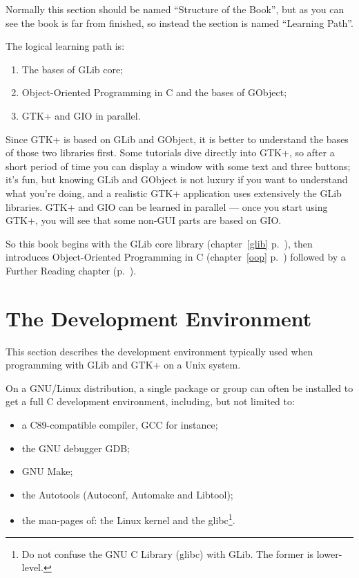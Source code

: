 Normally this section should be named ``Structure of the Book'', but as you can see the book is far from finished, so instead the section is named ``Learning Path''.

The logical learning path is:
\begin{enumerate}
  \item The bases of GLib core;
  \item Object-Oriented Programming in C and the bases of GObject;
  \item GTK+ and GIO in parallel.
\end{enumerate}

Since GTK+ is based on GLib and GObject, it is better to understand the bases of those two libraries first. Some tutorials dive directly into GTK+, so after a short period of time you can display a window with some text and three buttons; it's fun, but knowing GLib and GObject is not luxury if you want to understand what you're doing, and a realistic GTK+ application uses extensively the GLib libraries. GTK+ and GIO can be learned in parallel --- once you start using GTK+, you will see that some non-GUI parts are based on GIO.

So this book begins with the GLib core library (chapter~\ref{glib} p.~\pageref{glib}), then introduces Object-Oriented Programming in C (chapter~\ref{oop} p.~\pageref{oop}) followed by a Further Reading chapter (p.~\pageref{further-reading}).

\section{The Development Environment}
\label{intro-dev-environment}

This section describes the development environment typically used when programming with GLib and GTK+ on a Unix system.

On a GNU/Linux distribution, a single package or group can often be installed to get a full C development environment, including, but not limited to:
\begin{itemize}
  \item a C89-compatible compiler, GCC for instance;
  \item the GNU debugger GDB;
  \item GNU Make;
  \item the Autotools (Autoconf, Automake and Libtool);
  \item the man-pages of: the Linux kernel and the glibc\footnote{Do not confuse the GNU C Library (glibc) with GLib. The former is lower-level.}.
\end{itemize}

